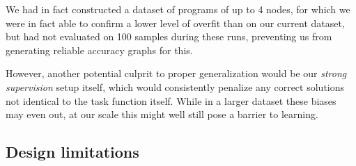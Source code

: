 \documentclass{article}
\begin{document}
We had in fact constructed a dataset of programs of up to 4 nodes,
for which we were in fact able to confirm a lower level of overfit than on our current dataset,
but had not evaluated on 100 samples during these runs,
preventing us from generating reliable accuracy graphs for this.

However, another potential culprit to proper generalization
would be our \emph{strong supervision} setup itself,
which would consistently penalize any correct solutions
not identical to the task function itself.
While in a larger dataset these biases may even out,
at our scale this might well still pose a barrier to learning.

\subsection{Design limitations}
\end{document}
